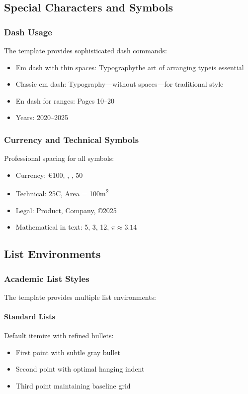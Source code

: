 \subsection{Special Characters and Symbols}

\subsubsection{Dash Usage}

The template provides sophisticated dash commands:

\begin{itemize}
\item Em dash with thin spaces: Typography\emdash the art of arranging type\emdash is essential
\item Classic em dash: Typography---without spaces---for traditional style
\item En dash for ranges: Pages 10--20
\item Years: 2020--2025
\end{itemize}

\subsubsection{Currency and Technical Symbols}

Professional spacing for all symbols:

\begin{itemize}
\item Currency: \euro 100, , , 50\cent
\item Technical: 25\degrees C, Area = 100m\textsuperscript{2}
\item Legal: Product\trademark, Company\registered, \copyright 2025
\item Mathematical in text: 5, 3, 12, $\pi \approx 3.14$
\end{itemize}

\subsection{List Environments}

\subsubsection{Academic List Styles}

The template provides multiple list environments:

\paragraph{Standard Lists} Default itemize with refined bullets:
\begin{itemize}
\item First point with subtle gray bullet
\item Second point with optimal hanging indent
\item Third point maintaining baseline grid
\end{itemize}

